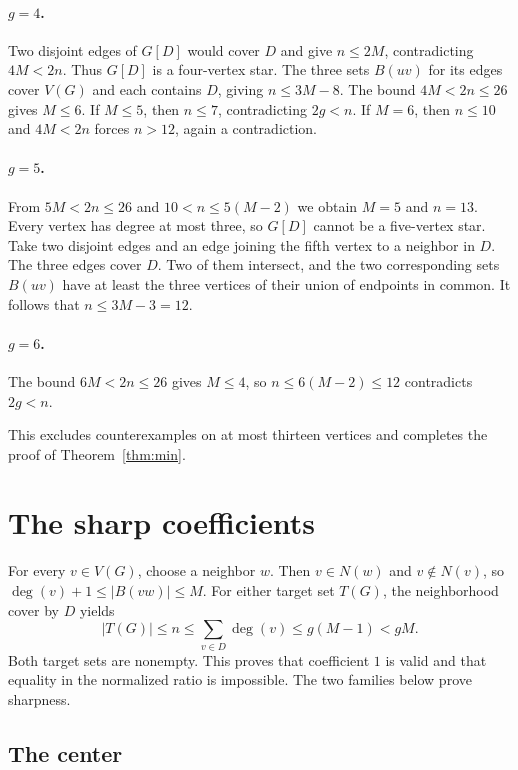 \documentclass[11pt]{article}
\begin{document}
\paragraph{\(g=4\).}
Two disjoint edges of \(G[D]\) would cover \(D\) and give \(n\le2M\),
contradicting \(4M<2n\). Thus \(G[D]\) is a four-vertex star.
The three sets \(B(uv)\) for its edges cover \(V(G)\) and each
contains \(D\), giving \(n\le3M-8\). The bound \(4M<2n\le26\)
gives \(M\le6\). If \(M\le5\), then \(n\le7\), contradicting
\(2g<n\). If \(M=6\), then \(n\le10\) and \(4M<2n\) forces
\(n>12\), again a contradiction.

\paragraph{\(g=5\).}
From \(5M<2n\le26\) and \(10<n\le5(M-2)\) we obtain \(M=5\)
and \(n=13\). Every vertex has degree at most three, so \(G[D]\)
cannot be a five-vertex star. Take two disjoint edges and an edge
joining the fifth vertex to a neighbor in \(D\). The three edges
cover \(D\). Two of them intersect, and the two corresponding
sets \(B(uv)\) have at least the three vertices of their union of
endpoints in common. It follows that \(n\le3M-3=12\).

\paragraph{\(g=6\).}
The bound \(6M<2n\le26\) gives \(M\le4\), so \(n\le6(M-2)\le12\)
contradicts \(2g<n\).

This excludes counterexamples on at most thirteen vertices and
completes the proof of Theorem~\ref{thm:min}.

\section{The sharp coefficients}

For every \(v\in V(G)\), choose a neighbor \(w\). Then \(v\in N(w)\)
and \(v\notin N(v)\), so \(\deg(v)+1\le|B(vw)|\le M\).
For either target set \(T(G)\), the neighborhood cover by \(D\) yields
\begin{equation}\label{eq:strict}
 |T(G)|\le n\le\sum_{v\in D}\deg(v)\le g(M-1)<gM.
\end{equation}
Both target sets are nonempty. This proves that coefficient \(1\)
is valid and that equality in the normalized ratio is impossible.
The two families below prove sharpness.

\subsection{The center}
\end{document}
